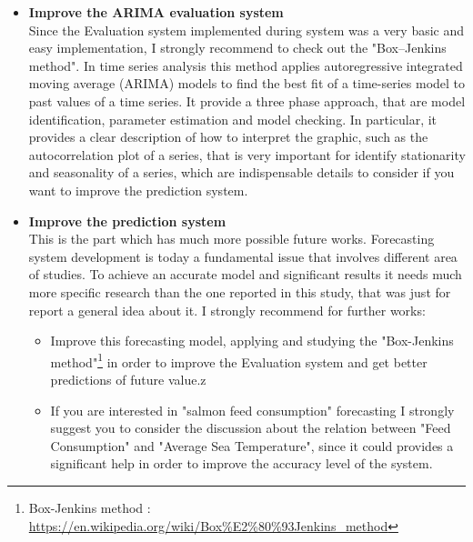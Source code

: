 \begin{itemize}
\newpage

\item \textbf{Improve the ARIMA evaluation system}\\ Since the Evaluation system implemented during system was a very basic and easy implementation, I strongly recommend to check out the "Box–Jenkins method"\cite{wiki:BoxJenkinsMethod}. In time series analysis this method applies autoregressive integrated moving average (ARIMA) models to find the best fit of a time-series model to past values of a time series. It provide a three phase approach, that are model identification, parameter estimation and model checking. In particular, it provides a clear description of how to interpret the graphic, such as the autocorrelation plot of a series, that is very important for identify stationarity and seasonality of a series, which are indispensable details to consider if you want to improve the prediction system.

\item \textbf{Improve the prediction system}\\ This is the part which has much more possible future works. Forecasting system development is today a fundamental issue that involves different area of studies. To achieve an accurate model and significant results it needs much more specific research than the one reported in this study, that was just for report a general idea about it. I strongly recommend for further works:
\begin{itemize}
\item Improve this forecasting model, applying and studying the "Box-Jenkins method"\footnote{Box-Jenkins method : \url{https://en.wikipedia.org/wiki/Box\%E2\%80\%93Jenkins\_method}} in order to improve the Evaluation system and get better predictions of future value.z
\item If you are interested in "salmon feed consumption" forecasting I strongly suggest you to consider the discussion about the relation between "Feed Consumption" and "Average Sea Temperature", since it could provides a significant help in order to improve the accuracy level of the system.
\end{itemize}
\end{itemize}



